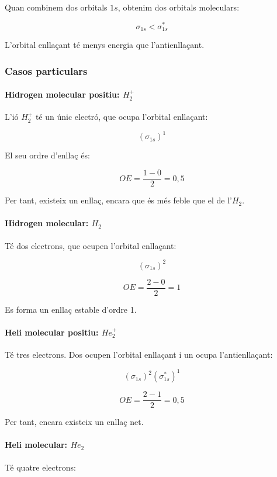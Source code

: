 \documentclass[12pt]{article}
\begin{document}
Quan combinem dos orbitals \(1s\), obtenim dos orbitals moleculars:

\[
\sigma_{1s}<\sigma^*_{1s}
\]

L'orbital enllaçant té menys energia que l'antienllaçant.

\subsubsection*{Casos particulars}

\paragraph{Hidrogen molecular positiu: \(H_2^+\)}

L'ió \(H_2^+\) té un únic electró, que ocupa l'orbital enllaçant:

\[
(\sigma_{1s})^1
\]

El seu ordre d'enllaç és:

\[
OE=\frac{1-0}{2}=\boxed{0,5}
\]

Per tant, existeix un enllaç, encara que és més feble que el de l'\(H_2\).

\paragraph{Hidrogen molecular: \(H_2\)}

Té dos electrons, que ocupen l'orbital enllaçant:

\[
(\sigma_{1s})^2
\]

\[
OE=\frac{2-0}{2}=\boxed{1}
\]

Es forma un enllaç estable d'ordre 1.

\paragraph{Heli molecular positiu: \(He_2^+\)}

Té tres electrons. Dos ocupen l'orbital enllaçant i un ocupa
l'antienllaçant:

\[
(\sigma_{1s})^2(\sigma^*_{1s})^1
\]

\[
OE=\frac{2-1}{2}=\boxed{0,5}
\]

Per tant, encara existeix un enllaç net.

\paragraph{Heli molecular: \(He_2\)}

Té quatre electrons:
\end{document}
